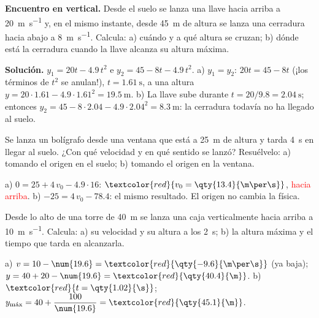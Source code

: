 \begin{example}
    \textbf{Encuentro en vertical.} Desde el suelo se lanza una llave hacia arriba a \qty{20}{\m\per\s} y, en el mismo instante, desde
    \qty{45}{\m} de altura se lanza una cerradura hacia abajo a \qty{8}{\m\per\s}. Calcula: a) cuándo y a qué altura se cruzan;
    b) dónde está la cerradura cuando la llave alcanza su altura máxima.

    \textbf{Solución.} \(y_1 = 20t - \num{4.9}\,t^2\) e \(y_2 = 45 - 8t - \num{4.9}\,t^2\).
    a) \(y_1 = y_2\): \(20t = 45 - 8t\) (¡los términos de \(t^2\) se anulan!), \(t = \qty{1.61}{\s}\), a una altura
    \(y = 20 \cdot \num{1.61} - \num{4.9} \cdot \num{1.61}^2 = \qty{19.5}{\m}\).
    b) La llave sube durante \(t = 20/\num{9.8} = \qty{2.04}{\s}\); entonces \(y_2 = 45 - 8 \cdot \num{2.04} - \num{4.9} \cdot
    \num{2.04}^2 = \qty{8.3}{\m}\): la cerradura todavía no ha llegado al suelo.
\end{example}

\begin{exercise}
    Se lanza un bolígrafo desde una ventana que está a \qty{25}{\m} de altura y tarda \qty{4}{\s} en llegar al suelo. ¿Con qué
    velocidad y en qué sentido se lanzó? Resuélvelo: a) tomando el origen en el suelo; b) tomando el origen en la ventana.
    \begin{solu}
        a) \(0 = 25 + 4\,v_0 - \num{4.9} \cdot 16\): \(\textcolor{red}{v_0 = \qty{13.4}{\m\per\s}}\), \textcolor{red}{hacia arriba}.
        b) \(-25 = 4\,v_0 - \num{78.4}\): el mismo resultado. El origen no cambia la física.
    \end{solu}
\end{exercise}

\begin{exercise}
    Desde lo alto de una torre de \qty{40}{\m} se lanza una caja verticalmente hacia arriba a \qty{10}{\m\per\s}. Calcula: a) su
    velocidad y su altura a los \qty{2}{\s}; b) la altura máxima y el tiempo que tarda en alcanzarla.
    \begin{solu}
        a) \(v = 10 - \num{19.6} = \textcolor{red}{\qty{-9.6}{\m\per\s}}\) (ya baja); \(y = 40 + 20 - \num{19.6} = \textcolor{red}{\qty{40.4}{\m}}\).
        b) \(\textcolor{red}{t = \qty{1.02}{\s}}\); \(y_{\text{máx}} = 40 + \dfrac{100}{\num{19.6}} = \textcolor{red}{\qty{45.1}{\m}}\).
    \end{solu}
\end{exercise}

